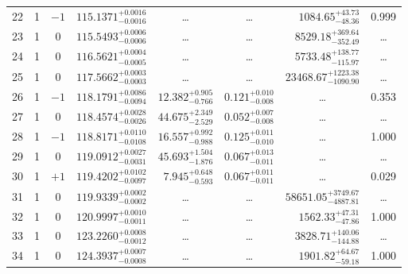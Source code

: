 \begin{table*}[!]
\begin{tabular}{llcrrlrc}
22 & 1 & $-1$ & $    115.1371_{-      0.0016}^{+      0.0016}$ & \multicolumn{1}{c}{\dots} & \multicolumn{1}{c}{\dots} & $     1084.65_{-       48.36}^{+       43.73}$ & 0.999\\[1pt]
23 & 1 & 0 & $    115.5493_{-      0.0006}^{+      0.0006}$ & \multicolumn{1}{c}{\dots} & \multicolumn{1}{c}{\dots} & $     8529.18_{-      352.49}^{+      369.64}$ & \dots\\[1pt]
24 & 1 & 0 & $    116.5621_{-      0.0005}^{+      0.0004}$ & \multicolumn{1}{c}{\dots} & \multicolumn{1}{c}{\dots} & $     5733.48_{-      115.97}^{+      138.77}$ & \dots\\[1pt]
25 & 1 & 0 & $    117.5662_{-      0.0003}^{+      0.0003}$ & \multicolumn{1}{c}{\dots} & \multicolumn{1}{c}{\dots} & $    23468.67_{-     1090.90}^{+     1223.38}$ & \dots\\[1pt]
26 & 1 & $-1$ & $    118.1791_{-      0.0094}^{+      0.0086}$ & $      12.382_{-       0.766}^{+       0.905}$ & $       0.121_{-       0.008}^{+       0.010}$ & \multicolumn{1}{c}{\dots} & 0.353\\[1pt]
27 & 1 & 0 & $    118.4574_{-      0.0026}^{+      0.0028}$ & $      44.675_{-       2.529}^{+       2.349}$ & $       0.052_{-       0.008}^{+       0.007}$ & \multicolumn{1}{c}{\dots} & \dots\\[1pt]
28 & 1 & $-1$ & $    118.8171_{-      0.0108}^{+      0.0110}$ & $      16.557_{-       0.988}^{+       0.992}$ & $       0.125_{-       0.010}^{+       0.011}$ & \multicolumn{1}{c}{\dots} & 1.000\\[1pt]
29 & 1 & 0 & $    119.0912_{-      0.0031}^{+      0.0027}$ & $      45.693_{-       1.876}^{+       1.504}$ & $       0.067_{-       0.011}^{+       0.013}$ & \multicolumn{1}{c}{\dots} & \dots \\[1pt]
30 & 1 & $+1$ & $    119.4202_{-      0.0097}^{+      0.0102}$ & $       7.945_{-       0.593}^{+       0.648}$ & $       0.067_{-       0.011}^{+       0.011}$ & \multicolumn{1}{c}{\dots} & 0.029\\[1pt]
31 & 1 & 0 & $    119.9339_{-      0.0002}^{+      0.0002}$ & \multicolumn{1}{c}{\dots} & \multicolumn{1}{c}{\dots} & $    58651.05_{-     4887.81}^{+     3749.67}$ & \dots\\[1pt]
32 & 1 & 0 & $    120.9997_{-      0.0011}^{+      0.0010}$ & \multicolumn{1}{c}{\dots} & \multicolumn{1}{c}{\dots} & $     1562.33_{-       47.86}^{+       47.31}$ & 1.000\\[1pt]
33 & 1 & 0 & $    123.2260_{-      0.0012}^{+      0.0008}$ & \multicolumn{1}{c}{\dots} & \multicolumn{1}{c}{\dots} & $     3828.71_{-      144.88}^{+      140.06}$ & \dots\\[1pt]
34 & 1 & 0 & $    124.3937_{-      0.0008}^{+      0.0007}$ & \multicolumn{1}{c}{\dots} & \multicolumn{1}{c}{\dots} & $     1901.82_{-       59.18}^{+       64.67}$ & 1.000\\[1pt]


\end{tabular}
\end{table*}
